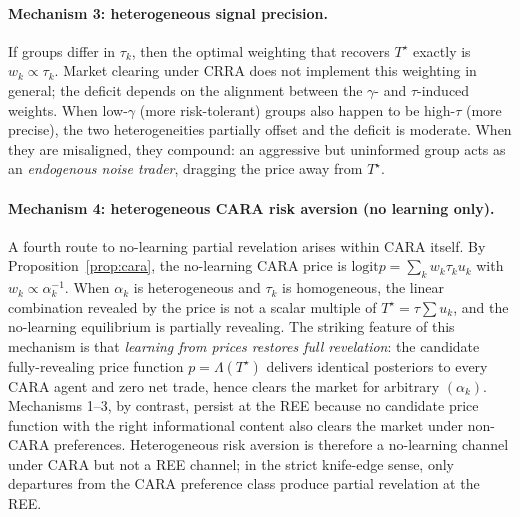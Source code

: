 \documentclass[12pt,letterpaper]{article}
\theoremstyle{definition}
\theoremstyle{remark}
\newcommand{\Lam}{\Lambda}            %
\newcommand{\logit}{\mathrm{logit}}
\newcommand{\Tstar}{T^{\!\star}}
\newcommand{\1}{\mathbf{1}}
\begin{document}
\paragraph{Mechanism 3: heterogeneous signal precision.} If groups differ
in $\tau_{k}$, then the optimal weighting that recovers $\Tstar$ exactly is
$w_{k}\propto\tau_{k}$. Market clearing under CRRA does not implement this
weighting in general; the deficit depends on the alignment between the
$\gamma$- and $\tau$-induced weights. When low-$\gamma$ (more
risk-tolerant) groups also happen to be high-$\tau$ (more precise), the
two heterogeneities partially offset and the deficit is moderate. When
they are misaligned, they compound: an aggressive but uninformed group
acts as an \emph{endogenous noise trader}, dragging the price away from
$\Tstar$.

\paragraph{Mechanism 4: heterogeneous CARA risk aversion (no learning only).}
A fourth route to no-learning partial revelation arises within CARA itself.
By Proposition~\ref{prop:cara}, the no-learning CARA price is
$\logit p=\sum_{k}w_{k}\tau_{k}u_{k}$ with $w_{k}\propto\alpha_{k}^{-1}$.
When $\alpha_{k}$ is heterogeneous and $\tau_{k}$ is homogeneous, the
linear combination revealed by the price is not a scalar multiple of
$\Tstar=\tau\sum u_{k}$, and the no-learning equilibrium is partially
revealing. The striking feature of this mechanism is that
\emph{learning from prices restores full revelation}: the candidate
fully-revealing price function $p=\Lam(\Tstar)$ delivers identical
posteriors to every CARA agent and zero net trade, hence clears the market
for arbitrary $(\alpha_{k})$. Mechanisms 1--3, by contrast, persist at the
REE because no candidate price function with the right informational
content also clears the market under non-CARA preferences.
Heterogeneous risk aversion is therefore a no-learning channel under CARA
but not a REE channel; in the strict knife-edge sense, only departures
from the CARA preference class produce partial revelation at the REE.
\end{document}
